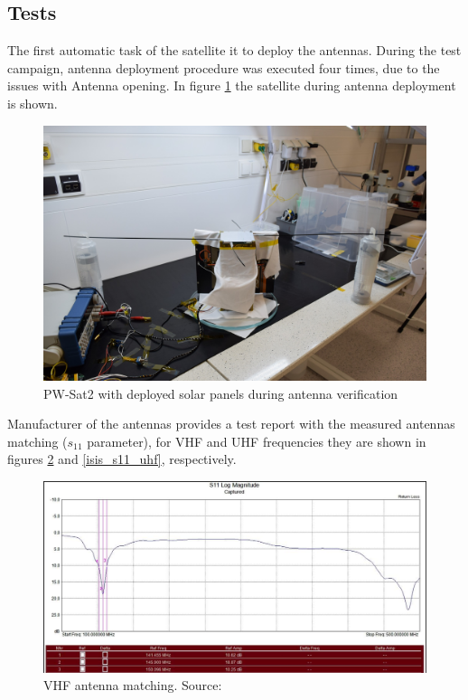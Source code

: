 \subsection{Tests}
The first automatic task of the satellite it to deploy the antennas. During the test campaign, antenna deployment procedure was executed four times, due to the issues with Antenna opening. In figure \ref{pwsat_with_deployed_antennas} the satellite during antenna deployment is shown.

\begin{figure}
    \centering
    \includegraphics[width=0.8\paperwidth]{img/6/pwsat_with_deployed_antennas.JPG}
    \caption{PW-Sat2 with deployed solar panels during antenna verification}
    \label{pwsat_with_deployed_antennas}
\end{figure}

Manufacturer of the antennas provides a test report with the measured antennas matching ($s_{11}$ parameter), for VHF and UHF frequencies they are shown in figures \ref{isis_s11_vhf} and \ref{isis_s11_uhf}, respectively.

\begin{figure}[H]
    \centering
    \includegraphics[width=0.8\paperwidth]{img/6/isis_s11_vhf.png}
    \caption{VHF antenna matching. Source: \cite{isis_ant_test_report}}
    \label{isis_s11_vhf}
\end{figure}

